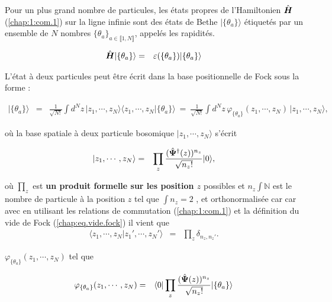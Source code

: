 Pour un plus grand nombre de particules, les états propres de l'Hamiltonien \(\hat{\bm{H}}\) (\ref{chap:1:com.1}) sur la ligne infinie sont des états de Bethe $\vert \{\theta_a\}\rangle $ étiquetés par un ensemble de $N$ nombres $\{\theta_a\}_{a \in \llbracket 1 , N \rrbracket } $, appelés les rapidités. %

\begin{eqnarray}
	\hat{\bm{H}} \vert \{\theta_a\}\rangle & = & \varepsilon(\{\theta_a\}) \vert \{\theta_a\}\rangle 		
\end{eqnarray}

L’état à deux particules peut être écrit dans la base positionnelle de Fock sous la forme :

\begin{eqnarray}
	\vert \{\theta_a\} \rangle & = & \frac{1}{\sqrt{N!}}\int d^Nz \, \vert z_1 , \cdots , z_N \rangle \langle z_1 , \cdots , z_N  \vert \{\theta_a\}  \rangle ~=~\frac{1}{\sqrt{N!}} \int d^Nz \, \varphi_{\{\theta_a\}}(z_1, \cdots ,  z_N)\, \vert z_1 , \cdots , z_N \rangle, \label{chap:1:N.part}
\end{eqnarray}

où la base spatiale à deux particule bosomique $\vert z_1 , \cdots ,  z_N \rangle$ s'écrit %

\begin{eqnarray}
	\vert z_1 , \cdots ,  z_N  \rangle  & = &  \prod_z\frac{(\hat{\bm{\Psi}}^\dag(z))^{n_z}}{\sqrt{n_z !}} \vert 0 \rangle ,
\end{eqnarray}

où $\prod_z$ est {\bf un produit formelle sur les position $z$} possibles et $n_z \int \mathbb{N}$ est le nombre de particule à la position $z$ tel que $\int n_z = 2$ , et orthonormalisée car car avec en utilisant les relations de commutation (\ref{chap:1:com.1})  et la définition du vide de Fock (\ref{chap:eq.vide.fock}) il vient que 
\begin{eqnarray}
	\langle z_1^{} , \cdots ,  z_N^{} \vert z_1' , \cdots ,  z_N' \rangle  & = & \prod_z\delta_{n_z^{},n_z'}.
\end{eqnarray}

 \(\varphi_{\{\theta_a\}}(z_1, \cdots ,  z_N)\) tel que 

\begin{eqnarray}
	\varphi_{\{\theta_a\}}(z_1, \cdots ,  z_N) & = & 	\langle 0 \vert  \prod_z\frac{(\hat{\bm{\Psi}}(z))^{n_z}}{\sqrt{n_z !}}\vert  \{\theta_a\}  \rangle 
\end{eqnarray}


